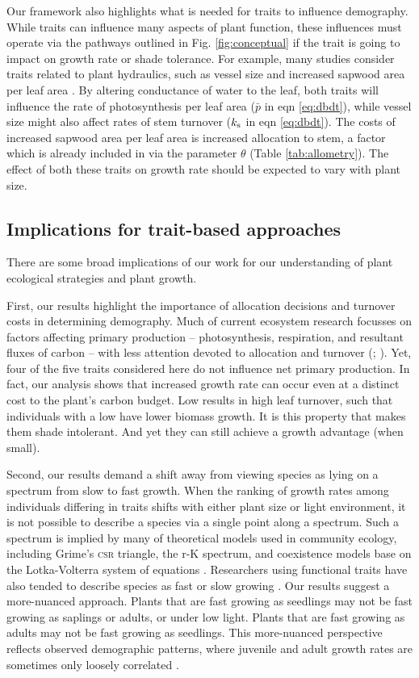 \documentclass[9pt,twocolumn,twoside,lineno]{pnas-new}
\begin{document}
Our framework also highlights what is needed for traits to influence demography. While traits can influence many aspects of plant function, these influences must operate via the pathways outlined in Fig. \ref{fig:conceptual} if the trait is going to impact on growth rate or shade tolerance. For example, many studies consider traits related to plant hydraulics, such as vessel size and increased sapwood area per leaf area \citep{Zanne-2010}. By altering conductance of water to the leaf, both traits will influence the rate of photosynthesis per leaf area ($\bar{p}$ in eqn \ref{eq:dbdt}), while vessel size might also affect rates of stem turnover ($k_{\rm s}$ in eqn \ref{eq:dbdt}). The costs of increased sapwood area per leaf area is increased allocation to stem, a factor which is already included in via the parameter $\theta$ (Table \ref{tab:allometry}). The effect of both these traits on growth rate should be expected to vary with plant size.

\subsection{Implications for trait-based approaches}
There are some broad implications of our work for our understanding of plant ecological strategies and plant growth.

First, our results highlight the importance of allocation decisions and turnover costs in determining demography. Much of current ecosystem research focusses on factors affecting primary production -- photosynthesis, respiration, and resultant fluxes of carbon -- with less attention devoted to allocation and turnover (\citealp{Friend-2014}; \citealp[for comparisons of models see][]{Sitch-2008, DeKauwe-2014}). Yet, four of the five traits considered here do not influence net primary production. In fact, our analysis shows that increased growth rate can occur even at a distinct cost to the plant's carbon budget. Low {\lma} results in high leaf turnover, such that individuals with a low {\lma} have lower biomass growth. It is this property that makes them shade intolerant. And yet they can still achieve a growth advantage (when small).

Second, our results demand a shift away from viewing species as lying on a spectrum  from slow to fast growth. When the ranking of growth rates among individuals differing in traits shifts with either plant size or light environment, it is not possible to describe a species via a single point along a spectrum. Such a spectrum is implied by many of theoretical models used in community ecology, including Grime's \textsc{csr} triangle, the r-K spectrum, and coexistence models base on the Lotka-Volterra system of equations \citep[e.g.][]{Grime-1977,Chesson-2000}. Researchers using functional traits have also tended to describe species as fast or slow growing \citep{Adler-2014, Diaz-2016}. Our results suggest a more-nuanced approach. Plants that are fast growing as seedlings may not be fast growing as saplings or adults, or under low light. Plants that are fast growing as adults may not be fast growing as seedlings. This more-nuanced perspective reflects observed demographic patterns, where juvenile and adult growth rates are sometimes only loosely correlated \citep{Rees-2001}.
\end{document}
